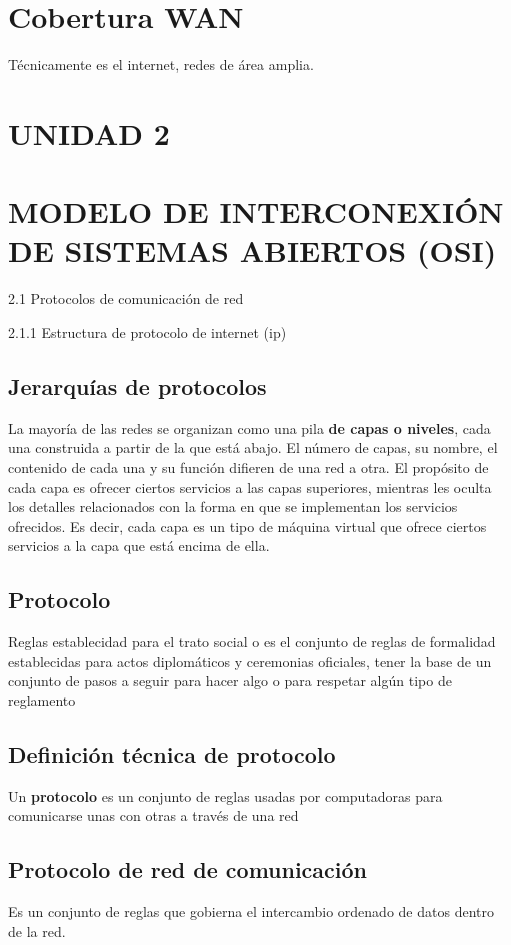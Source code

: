\documentclass[letterpaper,12pt]{article}
\begin{document}
\begin{sloppypar}
\section{Cobertura WAN}
Técnicamente es el internet, redes de área amplia.
\newpage
\section*{UNIDAD 2}
\section{MODELO DE INTERCONEXIÓN DE SISTEMAS ABIERTOS (OSI)}
2.1 Protocolos de comunicación de red

2.1.1 Estructura de protocolo de internet (ip)
\subsection{Jerarquías de protocolos}
La mayoría de las redes se organizan como una pila \textbf{de capas o niveles}, cada una construida a partir de la que está abajo. El número de capas, su nombre, el contenido
de cada una y su función difieren de una red a otra. El propósito de cada capa es ofrecer ciertos servicios
a las capas superiores, mientras les oculta los detalles relacionados con la forma en que se implementan
los servicios ofrecidos. Es decir, cada capa es un tipo de máquina virtual que ofrece ciertos servicios a la
capa que está encima de ella.
\subsection{Protocolo}
Reglas establecidad para el trato social o es el conjunto de reglas de formalidad establecidas para actos diplomáticos y ceremonias oficiales, tener la base de un conjunto de pasos a seguir para hacer algo o para respetar algún tipo de reglamento

\subsection{Definición técnica de protocolo}
Un \textbf{protocolo} es un conjunto de reglas usadas por computadoras para comunicarse unas con otras a través de una red

\subsection{Protocolo de red de comunicación}
Es un conjunto de reglas que gobierna el intercambio ordenado de datos dentro de la red.


\end{sloppypar}
\end{document}
